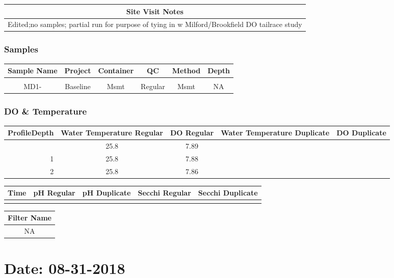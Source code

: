 \documentclass[
  letterpaper,
  DIV=11,
  numbers=noendperiod]{scrartcl}
\begin{document}
\begin{longtable*}{c}
\toprule
Site Visit Notes \\ 
\midrule\addlinespace[2.5pt]
Edited;no samples; partial run for purpose of tying in w Milford/Brookfield DO tailrace study \\ 
\bottomrule
\end{longtable*}

\subsubsection{Samples}

\begin{longtable*}{cccccc}
\toprule
Sample Name & Project & Container & QC & Method & Depth \\ 
\midrule\addlinespace[2.5pt]
 \\ 
\midrule\addlinespace[2.5pt]
MD1- & Baseline & Msmt & Regular & Msmt & NA \\ 
\bottomrule
\end{longtable*}

\subsubsection{DO \& Temperature}

\begin{longtable*}{rcccc}
\toprule
ProfileDepth & Water Temperature Regular & DO Regular & Water Temperature Duplicate & DO Duplicate \\ 
\midrule{} & 25.8 & 7.89 &  &  \\ 
1 & 25.8 & 7.88 &  &  \\ 
2 & 25.8 & 7.86 &  &  \\ 
\bottomrule
\end{longtable*}

\begin{longtable*}{lllll}
\toprule
Time & pH Regular & pH Duplicate & Secchi Regular & Secchi Duplicate \\ 
\midrule\addlinespace[2.5pt]
\bottomrule
\end{longtable*}

\begin{longtable*}{c}
\toprule
Filter Name \\ 
\midrule\addlinespace[2.5pt]
NA \\ 
\bottomrule
\end{longtable*}

\hypertarget{date-08-31-2018}{%
\section{Date: 08-31-2018}\label{date-08-31-2018}}
\end{document}

